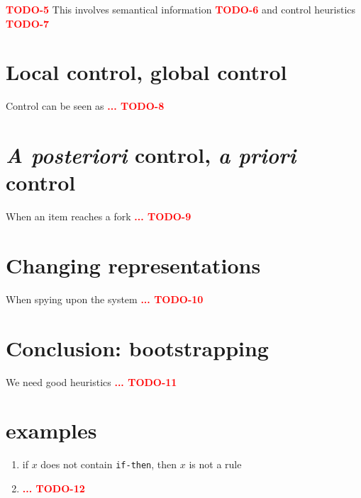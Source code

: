 \documentclass[11pt,a4paper,svgnames]{article}
\begin{document}
  
  {\textcolor{red}{\textbf{TODO-5}}}
  This involves semantical information
  {\textcolor{red}{\textbf{TODO-6}}}
  and control heuristics \cite{Lenat-Heuristics-1982,Lenat-Eurisko-1983}
  {\textcolor{red}{\textbf{TODO-7}}}

  \section{Local control, global control}
  \label{sec:loc-glob-control}

  Control can be seen as
  {\textcolor{red}{\textbf{... TODO-8}}}

  
  \section{\textit{A posteriori} control, \textit{a priori} control}
  \label{sec:posteriori-priori-control}
When an item reaches a fork
  {\textcolor{red}{\textbf{... TODO-9}}}
  
  \section{Changing representations}
  \label{sec:changing-repr}
  When spying upon the system
  {\textcolor{red}{\textbf{... TODO-10}}}
  
  \section{Conclusion: bootstrapping}
  \label{sec:concl-bootstrap}
  We need good heuristics 
  {\textcolor{red}{\textbf{... TODO-11}}}

  \section*{examples}

  \begin{enumerate}
  \item if $x$ does not contain \texttt{if-then}, then $x$ is not a rule
    \item  
      {\textcolor{red}{\textbf{... TODO-12}}}
      
  \end{enumerate}
  
\clearpage
{}



\end{document}

